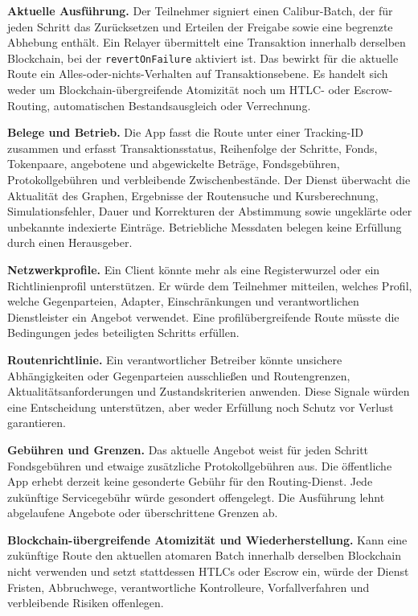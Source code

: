 \documentclass[11pt]{article}
\begin{document}
\textbf{Aktuelle Ausführung.} Der Teilnehmer signiert einen Calibur-Batch, der für jeden Schritt das Zurücksetzen und Erteilen der Freigabe sowie eine begrenzte Abhebung enthält. Ein Relayer übermittelt eine Transaktion innerhalb derselben Blockchain, bei der \texttt{revertOnFailure} aktiviert ist. Das bewirkt für die aktuelle Route ein Alles-oder-nichts-Verhalten auf Transaktionsebene. Es handelt sich weder um Blockchain-übergreifende Atomizität noch um HTLC- oder Escrow-Routing, automatischen Bestandsausgleich oder Verrechnung.

\textbf{Belege und Betrieb.} Die App fasst die Route unter einer Tracking-ID zusammen und erfasst Transaktionsstatus, Reihenfolge der Schritte, Fonds, Tokenpaare, angebotene und abgewickelte Beträge, Fondsgebühren, Protokollgebühren und verbleibende Zwischenbestände. Der Dienst überwacht die Aktualität des Graphen, Ergebnisse der Routensuche und Kursberechnung, Simulationsfehler, Dauer und Korrekturen der Abstimmung sowie ungeklärte oder unbekannte indexierte Einträge. Betriebliche Messdaten belegen keine Erfüllung durch einen Herausgeber.

\textbf{Netzwerkprofile.} Ein Client könnte mehr als eine Registerwurzel oder ein Richtlinienprofil unterstützen. Er würde dem Teilnehmer mitteilen, welches Profil, welche Gegenparteien, Adapter, Einschränkungen und verantwortlichen Dienstleister ein Angebot verwendet. Eine profilübergreifende Route müsste die Bedingungen jedes beteiligten Schritts erfüllen.

\textbf{Routenrichtlinie.} Ein verantwortlicher Betreiber könnte unsichere Abhängigkeiten oder Gegenparteien ausschließen und Routengrenzen, Aktualitätsanforderungen und Zustandskriterien anwenden. Diese Signale würden eine Entscheidung unterstützen, aber weder Erfüllung noch Schutz vor Verlust garantieren.

\textbf{Gebühren und Grenzen.} Das aktuelle Angebot weist für jeden Schritt Fondsgebühren und etwaige zusätzliche Protokollgebühren aus. Die öffentliche App erhebt derzeit keine gesonderte Gebühr für den Routing-Dienst. Jede zukünftige Servicegebühr würde gesondert offengelegt. Die Ausführung lehnt abgelaufene Angebote oder überschrittene Grenzen ab.

\textbf{Blockchain-übergreifende Atomizität und Wiederherstellung.} Kann eine zukünftige Route den aktuellen atomaren Batch innerhalb derselben Blockchain nicht verwenden und setzt stattdessen HTLCs oder Escrow ein, würde der Dienst Fristen, Abbruchwege, verantwortliche Kontrolleure, Vorfallverfahren und verbleibende Risiken offenlegen.
\end{document}
